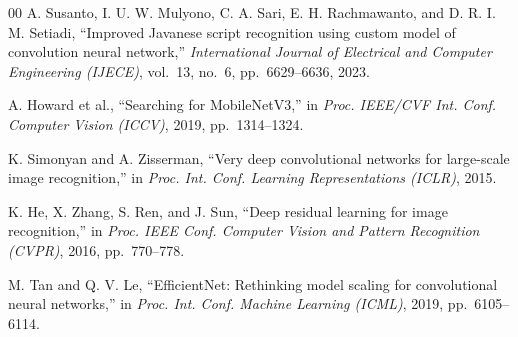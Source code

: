 \documentclass[conference]{IEEEtran}
\begin{document}
\begin{thebibliography}{00}
A. Susanto, I. U. W. Mulyono, C. A. Sari, E. H. Rachmawanto,
and D. R. I. M. Setiadi,
``Improved Javanese script recognition using custom model of
convolution neural network,''
\textit{International Journal of Electrical and Computer Engineering
(IJECE)}, vol.~13, no.~6, pp.~6629--6636, 2023.

A. Howard et al.,
``Searching for MobileNetV3,''
in \textit{Proc. IEEE/CVF Int. Conf. Computer Vision (ICCV)},
2019, pp.~1314--1324.

K. Simonyan and A. Zisserman,
``Very deep convolutional networks for large-scale image
recognition,''
in \textit{Proc. Int. Conf. Learning Representations (ICLR)},
2015.

K. He, X. Zhang, S. Ren, and J. Sun,
``Deep residual learning for image recognition,''
in \textit{Proc. IEEE Conf. Computer Vision and Pattern Recognition
(CVPR)}, 2016, pp.~770--778.

M. Tan and Q. V. Le,
``EfficientNet: Rethinking model scaling for convolutional neural
networks,''
in \textit{Proc. Int. Conf. Machine Learning (ICML)},
2019, pp.~6105--6114.

\end{thebibliography}
\end{document}
